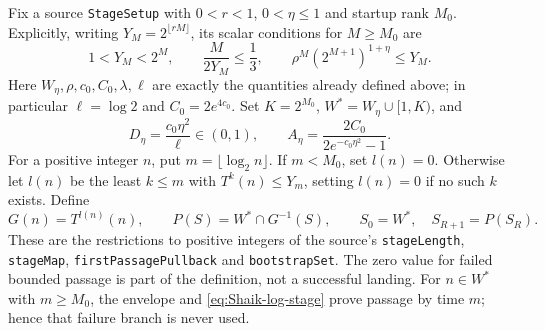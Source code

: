 Fix a source \texttt{StageSetup} with \(0<r<1\), \(0<\eta\le1\)
and startup rank \(M_0\). Explicitly, writing
\(Y_M=2^{\lfloor rM\rfloor}\), its scalar conditions for \(M\ge M_0\)
are
\begin{equation}\label{eq:Shaik-log-stage}
 1<Y_M<2^M,\qquad \frac{M}{2Y_M}\le\frac13,\qquad
 \rho^M(2^{M+1})^{1+\eta}\le Y_M .
\end{equation}
Here \(W_\eta,\rho,c_0,C_0,\lambda,\ell\) are exactly the quantities
already defined above; in particular \(\ell=\log2\) and
\(C_0=2e^{4c_0}\).
Set \(K=2^{M_0}\), \(W^*=W_\eta\cup[1,K)\), and
\[
 D_\eta=\frac{c_0\eta^2}{\ell}\in(0,1),\qquad
 A_\eta=\frac{2C_0}{2e^{-c_0\eta^2}-1}.
\]
For a positive integer \(n\), put \(m=\lfloor\log_2n\rfloor\).
If \(m<M_0\), set \(l(n)=0\).
Otherwise let \(l(n)\) be the least \(k\le m\) with
\(T^k(n)\le Y_m\), setting \(l(n)=0\) if no such \(k\) exists.
Define
\[
 G(n)=T^{l(n)}(n),\qquad
 P(S)=W^*\cap G^{-1}(S),\qquad
 S_0=W^*,\quad S_{R+1}=P(S_R).
\]
These are the restrictions to positive integers of the source's
\texttt{stageLength}, \texttt{stageMap}, \texttt{firstPassagePullback}
and \texttt{bootstrapSet}. The zero value for failed bounded passage
is part of the definition, not a successful landing. For \(n\in W^*\)
with \(m\ge M_0\), the envelope and \eqref{eq:Shaik-log-stage}
prove passage by time \(m\); hence that failure branch is never used.

